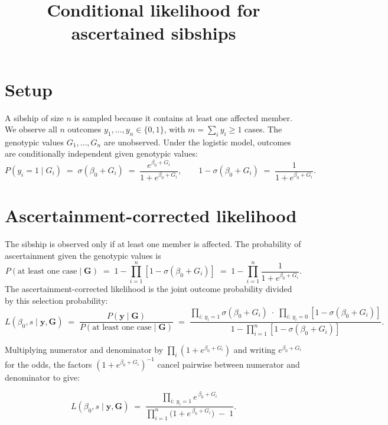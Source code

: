 \documentclass[12pt]{article}
\title{Conditional likelihood for ascertained sibships}
\author{}
\date{}
\begin{document}
\maketitle

\section*{Setup}

A sibship of size $n$ is sampled because it contains at least one affected
member.  We observe all $n$ outcomes $y_1,\ldots,y_n \in \{0,1\}$, with
$m = \sum_i y_i \geq 1$ cases.  The genotypic values $G_1,\ldots,G_n$ are
unobserved.  Under the logistic model, outcomes are conditionally independent
given genotypic values:
\[
  P(y_i = 1 \mid G_i) \;=\; \sigma(\beta_0 + G_i) \;=\;
  \frac{e^{\beta_0+G_i}}{1+e^{\beta_0+G_i}}, \qquad
  1 - \sigma(\beta_0+G_i) \;=\; \frac{1}{1+e^{\beta_0+G_i}}.
\]

\section*{Ascertainment-corrected likelihood}

The sibship is observed only if at least one member is affected.  The
probability of ascertainment given the genotypic values is
\[
  P(\text{at least one case} \mid \bm{G})
  \;=\;
  1 - \prod_{i=1}^n [1 - \sigma(\beta_0+G_i)]
  \;=\;
  1 - \prod_{i=1}^n \frac{1}{1+e^{\beta_0+G_i}}.
\]
The ascertainment-corrected likelihood is the joint outcome probability divided
by this selection probability:
\begin{equation}
  L(\beta_0, s \mid \bm{y}, \bm{G})
  \;=\;
  \frac{P(\bm{y} \mid \bm{G})}{P(\text{at least one case} \mid \bm{G})}
  \;=\;
  \frac{
    \displaystyle\prod_{i:\,y_i=1} \sigma(\beta_0+G_i)
    \;\cdot\;
    \displaystyle\prod_{i:\,y_i=0} [1-\sigma(\beta_0+G_i)]
  }{
    1 - \displaystyle\prod_{i=1}^n [1-\sigma(\beta_0+G_i)]
  }.
\end{equation}

Multiplying numerator and denominator by $\prod_i(1+e^{\beta_0+G_i})$ and
writing $e^{\beta_0+G_i}$ for the odds, the factors $(1+e^{\beta_0+G_i})^{-1}$
cancel pairwise between numerator and denominator to give:

\begin{equation}
  \boxed{
    L(\beta_0, s \mid \bm{y}, \bm{G})
    \;=\;
    \frac{
      \displaystyle\prod_{i:\,y_i=1} e^{\,\beta_0 + G_i}
    }{
      \displaystyle\prod_{i=1}^n \bigl(1 + e^{\,\beta_0 + G_i}\bigr) \;-\; 1
    }.
  }
\end{equation}
\end{document}
